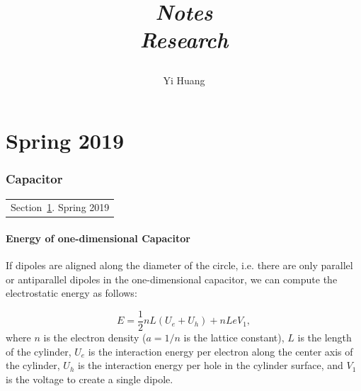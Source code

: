 \documentclass[10pt]{article}
\title{\begin{center}{\Huge \textit{Notes}}\\{{\itshape Research}}\end{center}}
\author{Yi Huang}
\affiliation{
University of Minnesota
}
\begin{document}
	\maketitle
	\flushbottom
	\newpage
	\pagestyle{fancynotes}
	\part{Spring 2019}
	\section{Capacitor}\label{sec:capacitor}
	\begin{margintable}\vspace{.8in}\footnotesize
		\begin{tabularx}{\marginparwidth}{|X}
		Section~\ref{sec:capacitor}. Spring 2019\\
		\end{tabularx}
	\end{margintable}

	\graphicspath{ {./images/} }

\subsection{Energy of one-dimensional Capacitor}

If dipoles are aligned along the diameter of the circle, i.e. there are only parallel or antiparallel dipoles in the one-dimensional capacitor, we can compute the electrostatic energy as follows:

\begin{equation}
	E = \frac{1}{2} nL (U_e + U_h) + nL eV_1,
\end{equation}
where $n$ is the electron density ($a=1/n$ is the lattice constant), $L$ is the length of the cylinder, $U_e$ is the interaction energy per electron along the center axis of the cylinder, $U_h$ is the interaction energy per hole in the cylinder surface, and $V_1$ is the voltage to create a single dipole.
\end{document}
